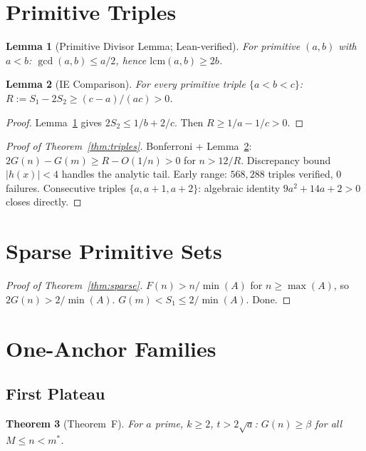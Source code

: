 \documentclass[11pt,a4paper]{article}
\newtheorem{theorem}{Theorem}[section]
\newtheorem{lemma}[theorem]{Lemma}
\theoremstyle{definition}
\begin{document}
\section{Primitive Triples}

\begin{lemma}[Primitive Divisor Lemma; Lean-verified]\label{lem:pdl}
For primitive $(a,b)$ with $a < b$: $\gcd(a,b) \leq a/2$, hence
$\mathrm{lcm}(a,b) \geq 2b$.
\end{lemma}

\begin{lemma}[IE Comparison]\label{lem:ie}
For every primitive triple $\{a < b < c\}$:
$R := S_1 - 2S_2 \geq (c{-}a)/(ac) > 0$.
\end{lemma}

\begin{proof}
Lemma~\ref{lem:pdl} gives $2S_2 \leq 1/b + 2/c$. Then
$R \geq 1/a - 1/c > 0$.
\end{proof}

\begin{proof}[Proof of Theorem~\ref{thm:triples}]
Bonferroni + Lemma~\ref{lem:ie}: $2G(n) - G(m) \geq R - O(1/n) > 0$
for $n > 12/R$. Discrepancy bound $|h(x)| < 4$ handles the analytic
tail. Early range: $568{,}288$ triples verified, $0$ failures.
Consecutive triples $\{a, a{+}1, a{+}2\}$: algebraic identity
$9a^2 + 14a + 2 > 0$ closes directly.
\end{proof}

\section{Sparse Primitive Sets}

\begin{proof}[Proof of Theorem~\ref{thm:sparse}]
$F(n) > n/\min(A)$ for $n \geq \max(A)$, so $2G(n) > 2/\min(A)$.
$G(m) < S_1 \leq 2/\min(A)$. Done.
\end{proof}

\section{One-Anchor Families}

\subsection{First Plateau}

\begin{theorem}[Theorem~F]\label{thm:plateau}
For $a$ prime, $k \geq 2$, $t > 2\sqrt{a}$: $G(n) \geq \beta$ for
all $M \leq n < m^*$.
\end{theorem}
\end{document}
